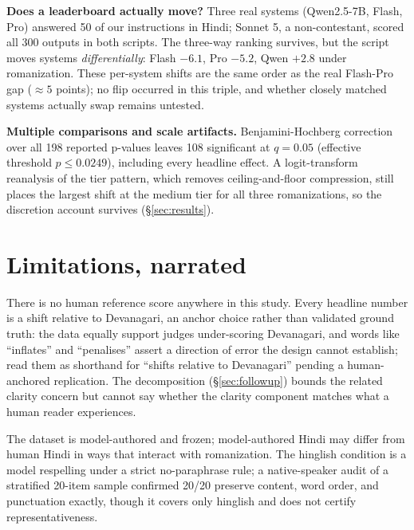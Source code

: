 \textbf{Does a leaderboard actually move?} Three real systems (Qwen2.5-7B, Flash, Pro) answered 50 of our instructions in Hindi; Sonnet 5, a non-contestant, scored all 300 outputs in both scripts. The three-way ranking survives, but the script moves systems \emph{differentially}: Flash $-6.1$, Pro $-5.2$, Qwen $+2.8$ under romanization. These per-system shifts are the same order as the real Flash-Pro gap ($\approx 5$ points); no flip occurred in this triple, and whether closely matched systems actually swap remains untested.

\textbf{Multiple comparisons and scale artifacts.} Benjamini-Hochberg correction over all 198 reported p-values leaves 108 significant at $q = 0.05$ (effective threshold $p \le 0.0249$), including every headline effect. A logit-transform reanalysis of the tier pattern, which removes ceiling-and-floor compression, still places the largest shift at the medium tier for all three romanizations, so the discretion account survives (\S\ref{sec:results}).

\section{Limitations, narrated}
\label{sec:limitations}



There is no human reference score anywhere in this study. Every headline number is a shift relative to Devanagari, an anchor choice rather than validated ground truth: the data equally support judges under-scoring Devanagari, and words like ``inflates'' and ``penalises'' assert a direction of error the design cannot establish; read them as shorthand for ``shifts relative to Devanagari'' pending a human-anchored replication. The decomposition (\S\ref{sec:followup}) bounds the related clarity concern but cannot say whether the clarity component matches what a human reader experiences.

The dataset is model-authored and frozen; model-authored Hindi may differ from human Hindi in ways that interact with romanization. The hinglish condition is a model respelling under a strict no-paraphrase rule; a native-speaker audit of a stratified 20-item sample confirmed 20/20 preserve content, word order, and punctuation exactly, though it covers only hinglish and does not certify representativeness.

